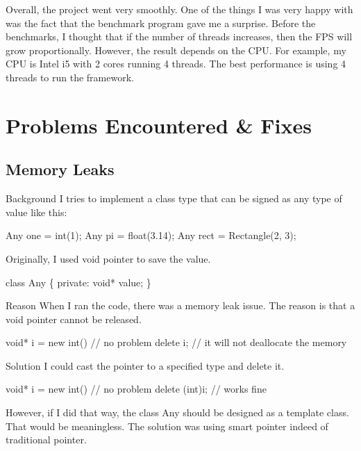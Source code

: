 Overall, the project went very smoothly. One of the things I was very happy with was the fact that the benchmark program gave me a surprise. Before the benchmarks, I thought that if the number of threads increases, then the F\+P\+S will grow proportionally. However, the result depends on the C\+P\+U. For example, my C\+P\+U is Intel i5 with 2 cores running 4 threads. The best performance is using 4 threads to run the framework.\hypertarget{_reviewof_project_ReviewofProjectPEF}{}\section{Problems Encountered \& Fixes}\label{_reviewof_project_ReviewofProjectPEF}
\hypertarget{_reviewof_project_ReviewofProjectPEFMemoryLeaks}{}\subsection{Memory Leaks}\label{_reviewof_project_ReviewofProjectPEFMemoryLeaks}
\begin{DoxyParagraph}{Background}
I tries to implement a class type that can be signed as any type of value like this\+: 
\begin{DoxyCode}
Any one = int(1);
Any pi = float(3.14);
Any rect = Rectangle(2, 3);
\end{DoxyCode}
 Originally, I used void pointer to save the value. 
\begin{DoxyCode}
\textcolor{keyword}{class }Any
\{
\textcolor{keyword}{private}:
    \textcolor{keywordtype}{void}* value;
\}
\end{DoxyCode}
 
\end{DoxyParagraph}
\begin{DoxyParagraph}{Reason}
When I ran the code, there was a memory leak issue. The reason is that a void pointer cannot be released. 
\begin{DoxyCode}
\textcolor{keywordtype}{void}* i = \textcolor{keyword}{new} int() \textcolor{comment}{// no problem}
delete i; \textcolor{comment}{// it will not deallocate the memory}
\end{DoxyCode}
 
\end{DoxyParagraph}
\begin{DoxyParagraph}{Solution}
I could cast the pointer to a specified type and delete it. 
\begin{DoxyCode}
\textcolor{keywordtype}{void}* i = \textcolor{keyword}{new} int() \textcolor{comment}{// no problem}
delete (\textcolor{keywordtype}{int})i; \textcolor{comment}{// works fine}
\end{DoxyCode}
 However, if I did that way, the class Any should be designed as a template class. That would be meaningless. The solution was using smart pointer indeed of traditional pointer.
\end{DoxyParagraph}
